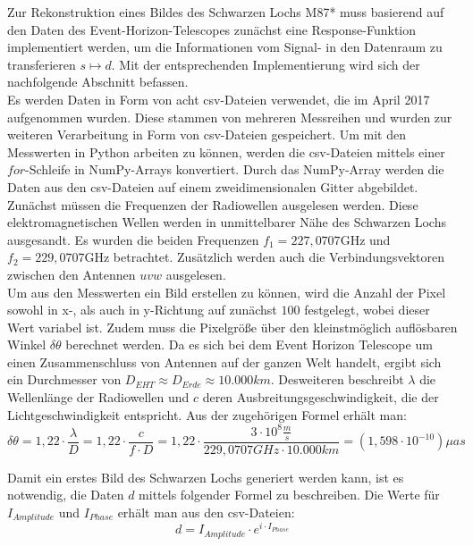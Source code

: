 \documentclass[]{dsadokumentation}
\begin{document}
Zur Rekonstruktion eines Bildes des Schwarzen Lochs M87* muss basierend auf den Daten des Event-Horizon-Telescopes zunächst eine Response-Funktion implementiert werden, um die Informationen vom Signal- in den Datenraum zu transferieren $s \mapsto d$. Mit der entsprechenden Implementierung wird sich der nachfolgende Abschnitt befassen.\\

Es werden Daten in Form von acht csv-Dateien verwendet, die im April 2017 aufgenommen wurden. Diese stammen von mehreren Messreihen und wurden zur weiteren Verarbeitung in Form von csv-Dateien gespeichert.
Um mit den Messwerten in Python arbeiten zu können, werden die csv-Dateien mittels einer $for$-Schleife in NumPy-Arrays konvertiert. Durch das NumPy-Array werden die Daten aus den csv-Dateien auf einem zweidimensionalen Gitter abgebildet.\\

Zunächst müssen die Frequenzen der Radiowellen ausgelesen werden. Diese elektromagnetischen Wellen werden in unmittelbarer Nähe des Schwarzen Lochs ausgesandt. Es wurden die beiden Frequenzen $f_1 = 227,0707 \mathrm{GHz}$ und $f_2 = 229,0707 \mathrm{GHz}$ betrachtet. Zusätzlich werden auch die Verbindungsvektoren zwischen den Antennen $uvw$ ausgelesen.\\

Um aus den Messwerten ein Bild erstellen zu können, wird die Anzahl der Pixel sowohl in x-, als auch in y-Richtung auf zunächst $100$ festgelegt, wobei dieser Wert variabel ist. Zudem muss die Pixelgröße über den kleinstmöglich auflösbaren Winkel $\delta \theta$ berechnet werden. Da es sich bei dem Event Horizon Telescope um einen Zusammenschluss von Antennen auf der ganzen Welt handelt, ergibt sich ein Durchmesser von $D_{EHT} \approx D_{Erde} \approx 10.000km$. Desweiteren beschreibt $\lambda$ die Wellenlänge der Radiowellen und $c$ deren Ausbreitungsgeschwindigkeit, die der Lichtgeschwindigkeit entspricht. Aus der zugehörigen Formel erhält man:
\[ \delta \theta = 1,22 \cdot \displaystyle\frac{\lambda}{D} = 1,22 \cdot \displaystyle\frac{c}{f \cdot D} = 1,22 \cdot \displaystyle\frac{3 \cdot 10^{8} \displaystyle\frac{m}{s}} {229,0707 GHz \cdot 10.000 km} = (1,598 \cdot 10^{-10}) \mu as \]

Damit ein erstes Bild des Schwarzen Lochs generiert werden kann, ist es notwendig, die Daten $d$ mittels folgender Formel zu beschreiben. Die Werte für $I_{Amplitude}$ und $I_{Phase}$ erhält man aus den csv-Dateien:
\[ d = I_{Amplitude} \cdot e^{i \cdot I_{Phase}} \]
\end{document}
